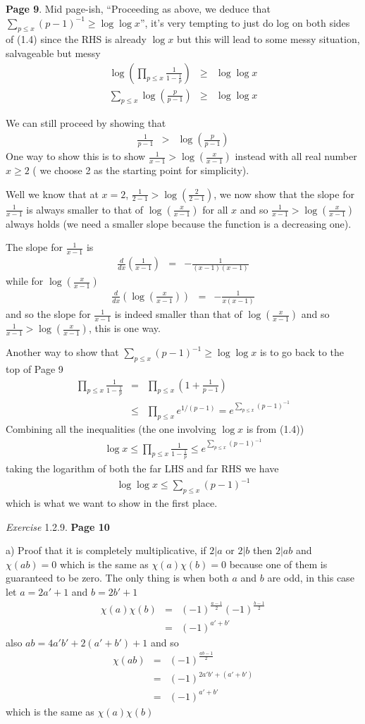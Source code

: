 \documentclass[aps,preprint,preprintnumbers,nofootinbib,showpacs,prd]{revtex4-1}
\newcommand{\nbea}{\begin{eqnarray*}}
\newcommand{\neea}{\end{eqnarray*}}
\begin{document}
{\bf Page 9}. Mid page-ish, ``Proceeding as above, we deduce that $\sum_{p\le x}(p-1)^{-1} \ge \log \log x$'', it's very tempting to just do log on both sides of (1.4) since the RHS is already $\log x$ but this will lead to some messy situation, salvageable but messy
%
\nbea
\log \left ( \prod_{p\le x} \frac{1}{1 - \frac{1}{p}} \right ) & \ge & \log \log x \\
\sum_{p\le x} \log \left (\frac{p}{p-1}\right ) & \ge & \log \log x
\neea
%

We can still proceed by showing that
%
\nbea
\frac{1}{p - 1} & > & \log \left (\frac{p}{p-1}\right )
\neea
%
One way to show this is to show $\frac{1}{x - 1} > \log \left (\frac{x}{x-1}\right )$ instead with all real number $x \ge 2$ ( we choose 2 as the starting point for simplicity).

Well we know that at $x = 2$, $\frac{1}{2 - 1} > \log \left (\frac{2}{2-1}\right )$, we now show that the slope for $\frac{1}{x - 1}$ is always smaller to that of $\log \left (\frac{x}{x-1}\right )$ for all $x$ and so $\frac{1}{x - 1} > \log \left (\frac{x}{x-1}\right )$ always holds (we need a smaller slope because the function is a decreasing one).

The slope for $\frac{1}{x - 1}$ is
%
\nbea
\frac{d}{dx}\left( \frac{1}{x - 1} \right ) & = & -\frac{1}{(x-1)(x-1)}
\neea
%
while for $\log \left (\frac{x}{x-1}\right )$
%
\nbea
\frac{d}{dx} \left (\log \left (\frac{x}{x-1}\right ) \right ) & = & -\frac{1}{x(x-1)}
\neea
%
and so the slope for $\frac{1}{x - 1}$ is indeed smaller than that of $\log \left (\frac{x}{x-1}\right )$ and so $\frac{1}{x - 1} > \log \left (\frac{x}{x-1}\right )$, this is one way.

Another way to show that $\sum_{p\le x}(p-1)^{-1} \ge \log \log x$ is to go back to the top of Page 9
%
\nbea
\prod_{p \le x} \frac{1}{1 - \frac{1}{p}} & = & \prod_{p \le x} \left ( 1 + \frac{1}{p - 1} \right ) \\
& \le & \prod_{p \le x} e^{1/(p-1)} = e^{\sum_{p\le x}(p-1)^{-1}}
\neea
%
Combining all the inequalities (the one involving $\log x$ is from (1.4))
%
\nbea
\log x \le \prod_{p \le x} \frac{1}{1 - \frac{1}{p}} \le e^{\sum_{p\le x}(p-1)^{-1}}
\neea
%
taking the logarithm of both the far LHS and far RHS we have
%
\nbea
\log \log x \le \sum_{p\le x}(p-1)^{-1}
\neea
%
which is what we want to show in the first place.

{\it Exercise} 1.2.9. {\bf Page 10}

a) Proof that it is completely multiplicative, if $2|a$ or $2|b$ then $2|ab$ and $\chi(ab) = 0$ which is the same as $\chi(a)\chi(b) = 0$ because one of them is guaranteed to be zero. The only thing is when both $a$ and $b$ are odd, in this case let $a = 2a' + 1$ and $b = 2b' + 1$
%
\nbea
\chi(a)\chi(b) & = & (-1)^{\frac{a - 1}{2}}(-1)^{\frac{b - 1}{2}} \\
& = & (-1)^{a' + b'}
\neea
%
also $ab = 4a'b' + 2(a' + b') + 1$ and so
%
\nbea
\chi(ab) & = & (-1)^{\frac{ab - 1}{2}} \\
& = & (-1)^{2a'b' + (a' + b')} \\
& = & (-1)^{a' + b'}
\neea
%
which is the same as $\chi(a)\chi(b)$
\end{document}
